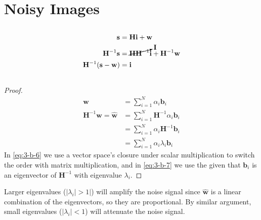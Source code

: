 \documentclass[]{article}
\numberwithin{equation}{section}
\begin{document}
\section{Noisy Images}

\subsection{}

\begin{align}
	\mathbf{s} &= \mathbf{Hi + w} \\
	\mathbf{H}^{-1} \mathbf{s} &= \cancelto{\mathbf{I}}{\mathbf{HH}^{-1}}\mathbf{i} + \mathbf{H}^{-1} \mathbf{w} \\
	\mathbf{H}^{-1} (\mathbf{s - w})  &= \mathbf{i}
\end{align}

\subsection{}

\begin{proof}
\begin{align}
	\mathbf{w} &= \sum_{i = 1}^{N} \alpha_i \mathbf{b}_i \\
	\mathbf{H}^{-1} \mathbf{w} = \hat{\mathbf{w}} &= \sum_{i = 1}^{N} \mathbf{H}^{-1} \alpha_i \mathbf{b}_i \\
	&= \sum_{i = 1}^{N} \alpha_i \mathbf{H}^{-1} \mathbf{b}_i \label{eq:3-b-6}\\
	&= \sum_{i = 1}^{N} \alpha_i \lambda_i \mathbf{b}_i \label{eq:3-b-7}
\end{align}
In \autoref{eq:3-b-6} we use a vector space's closure under scalar multiplication to switch the order with matrix multiplication, and in \autoref{eq:3-b-7} we use the given that \(\mathbf{b}_i\) is an eigenvector of \(\mathbf{H}^{-1}\) with eigenvalue \(\lambda_i\). 
\end{proof}
Larger eigenvalues (\(|\lambda_i| > 1|\)) will amplify the noise signal since \(\hat{\mathbf{w}}\) is a linear combination of the eigenvectors, so they are proportional. 
By similar argument, small eigenvalues (\(|\lambda_i| < 1\)) will attenuate the noise signal. 

\subsection{}
\end{document}
